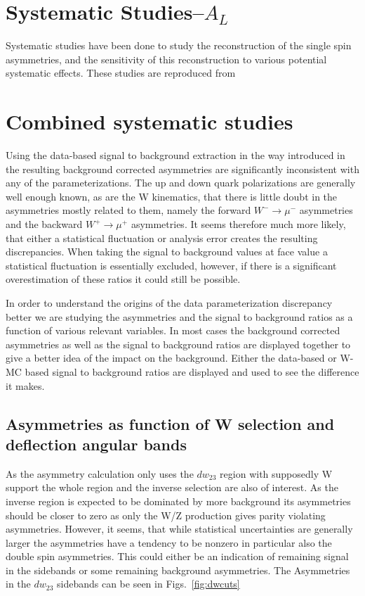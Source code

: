 \clearpage
\appendix
\section{Systematic Studies--$A_L$}
\label{appendix_1}

Systematic studies have been done to study the reconstruction of the single spin
asymmetries, and the sensitivity of this reconstruction to various potential
systematic effects. These studies are reproduced from~\cite{Seidl2014a}

\section{Combined systematic studies}
Using the data-based signal to background extraction in the way introduced in
\cite{Oide2012} the resulting background corrected asymmetries are significantly
inconsistent with any of the parameterizations. The up and down quark
polarizations are generally well enough known, as are the W kinematics, that
there is little doubt in the asymmetries mostly related to them, namely the
forward $W^-\rightarrow \mu^-$ asymmetries and the backward
$W^+\rightarrow\mu^+$ asymmetries. It seems therefore much more likely, that
either a statistical fluctuation or analysis error creates the resulting
discrepancies. When taking the signal to background values at face value a
statistical fluctuation is essentially excluded, however, if there is a
significant overestimation of these ratios it could still be possible. 

In order to understand the origins of the data parameterization discrepancy
better we are studying the asymmetries and the signal to background ratios as a
function of various relevant variables. In most cases the background corrected
asymmetries as well as the signal to background ratios are displayed together to
give a better idea of the impact on the background. Either the data-based or
W-MC based signal to background ratios are displayed and used to see the
difference it makes.

\subsection{Asymmetries as function of W selection and deflection angular bands}

As the asymmetry calculation only uses the $dw_{23}$ region with supposedly W support
the whole region and the inverse selection are also of interest. As the inverse
region is expected to be dominated by more background its asymmetries should be
closer to zero as only the W/Z production gives parity violating asymmetries.
However, it seems, that while statistical uncertainties are generally larger the
asymmetries have a tendency to be nonzero in particular also the double spin
asymmetries. This could either be an indication of remaining signal in the
sidebands or some remaining background asymmetries. The Asymmetries in the
$dw_{23}$ sidebands can be seen in Figs.~\ref{fig:dwcuts}

